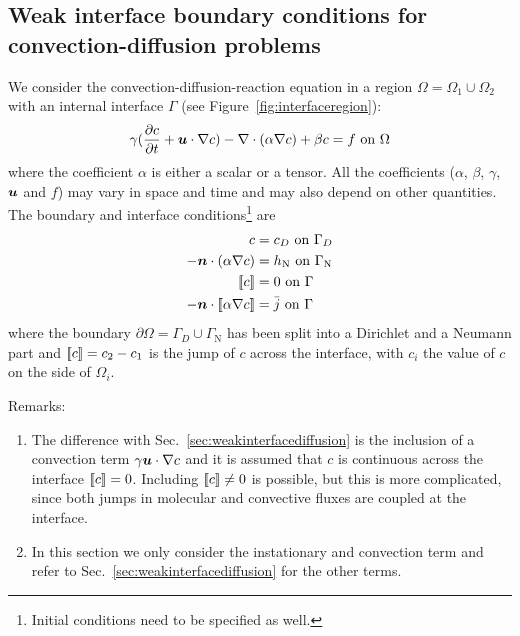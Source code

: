 \subsection{Weak interface boundary conditions for convection-diffusion
            problems}
\label{sec:weakinterfaceconvection}

We consider the convection-diffusion-reaction
equation in a region $\Omega=\Omega_1\cup\Omega_2$ with an internal interface
$\Gamma$ (see Figure~\ref{fig:interfaceregion}):
\begin{equation}
    \gamma(\dfrac{\partial c}{\partial t} + \boldsymbol{u}\cdot\nabla c) -\nabla \cdot( \alpha \nabla c)
+ \beta c = f\text{ on }\Omega
 \label{eq:interface_convection}
\end{equation}
where the coefficient $\alpha$ is either a scalar or a tensor. All the
coefficients ($\alpha$, $\beta$, $\gamma$, $\boldsymbol{u}$ and $f$) may vary in
space and time and may also depend on other quantities.
The boundary and interface conditions\footnote{Initial conditions
need to be specified as well.} are
\begin{align}
    c &= c_D\text{ on }\Gamma_D\\
    -\boldsymbol{n}\cdot(\alpha\nabla c)&=h_{\text{N}}\text{ on }\Gamma_{\text{N}}\\
     \text{[\![} c \text{]\!]} &= 0 \text{ on }\Gamma\\
    -\boldsymbol{n}\cdot\text{[\![}\alpha\nabla c\text{]\!]}&=\bar j\text{ on }\Gamma\label{eq:jbarc}
\end{align}
where the boundary $\partial\Omega=\Gamma_D\cup\Gamma_{\text{N}}$ has
been split into a Dirichlet and a Neumann part and $\text{[\![} c\text{]\!]}=c_2-c_1$ is the
jump of $c$ across the interface, with $c_i$ the value of $c$ on the side of
$\Omega_i$.

Remarks:
\begin{enumerate}
   \item The difference with Sec.~\ref{sec:weakinterfacediffusion} is the
inclusion of a convection term $\gamma\boldsymbol{u}\cdot\nabla c$
and it is assumed that $c$ is continuous across the interface $\text{[\![} c\text{]\!]}=0$.
Including $\text{[\![} c\text{]\!]}\neq 0$ is possible, but this is more complicated, since
both jumps in molecular and convective fluxes are coupled at the interface.
   \item In this section we only consider the instationary and convection term
and refer to Sec.~\ref{sec:weakinterfacediffusion} for the other terms.
\end{enumerate}

